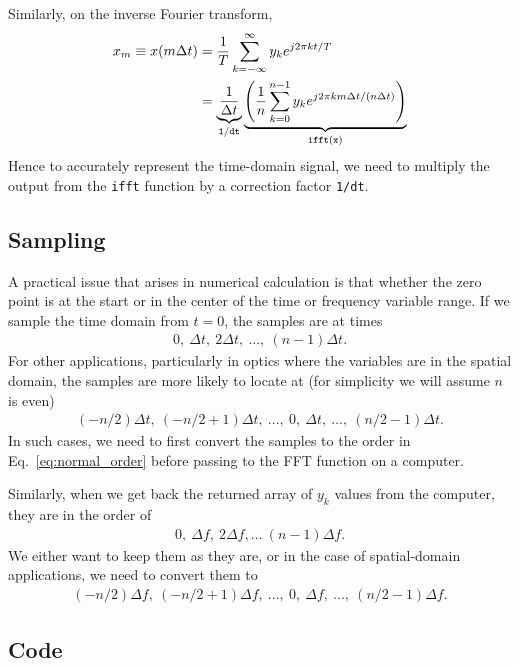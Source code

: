 \documentclass{article}
\begin{document}
Similarly, on the inverse Fourier transform,
\begin{align}
    x_m \equiv x(m\Delta t) &= \frac{1}{T} \sum_{k=-\infty}^\infty y_k e^{j2\pi kt/T}\\
    &= \underbrace{\frac{1}{\Delta t}}_{{\tt 1/dt}}
       \underbrace{\left(\frac{1}{n}\sum_{k=0}^{n-1} y_k e^{j2\pi km\Delta t/(n\Delta t)}\right)}_{{\tt ifft(x)}}
\end{align}
Hence to accurately represent the time-domain signal, we need to multiply the output from the {\tt ifft}
function by a correction factor {\tt 1/dt}.

\subsection{Sampling}

A practical issue that arises in numerical calculation is that whether the zero point is at the
start or in the center of the time or frequency variable range. If we sample the time domain from
$t = 0$, the samples are at times
\begin{align}
    0, \ \Delta t, \ 2\Delta t, \ ..., \ (n-1)\Delta t. \label{eq:normal_order}
\end{align}
For other applications, particularly in optics where the variables are in the spatial domain,
the samples are more likely to locate at (for simplicity we will assume $n$ is even)
\begin{align}
    (-n/2)\Delta t, \ (-n/2+1)\Delta t,\ ...,\ 0,\ \Delta t,\ ...,\ (n/2-1)\Delta t.
\end{align}
In such cases, we need to first convert the samples to the order in Eq.~\ref{eq:normal_order}
before passing to the FFT function on a computer.

Similarly, when we get back the returned array of $y_k$ values from the computer, they are in
the order of
\begin{align}
    0, \ \Delta f, \ 2\Delta f, ... \ (n-1)\Delta f.
\end{align}
We either want to keep them as they are, or in the case of spatial-domain applications, we need
to convert them to
\begin{align}
    (-n/2)\Delta f, \ (-n/2+1)\Delta f,\ ...,\ 0,\ \Delta f,\ ...,\ (n/2-1)\Delta f.
\end{align}

\subsection{Code}
\end{document}

